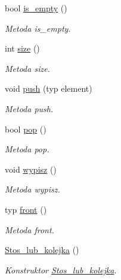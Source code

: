 \begin{DoxyCompactItemize}
\item 
bool \hyperlink{class_stos__lub__kolejka_ae3ed97741c87e68ab828989140b6cf6e}{is\+\_\+empty} ()
\begin{DoxyCompactList}\small\item\em Metoda is\+\_\+empty. \end{DoxyCompactList}\item 
int \hyperlink{class_stos__lub__kolejka_a11ef2a4fc9973ec37aa5a28a2ea824ba}{size} ()
\begin{DoxyCompactList}\small\item\em Metoda size. \end{DoxyCompactList}\item 
void \hyperlink{class_stos__lub__kolejka_ad514d78e27f4eed981eff2321e6b503e}{push} (typ element)
\begin{DoxyCompactList}\small\item\em Metoda push. \end{DoxyCompactList}\item 
bool \hyperlink{class_stos__lub__kolejka_a3d511f510942d9f0ac52a1fedee9100b}{pop} ()
\begin{DoxyCompactList}\small\item\em Metoda pop. \end{DoxyCompactList}\item 
void \hyperlink{class_stos__lub__kolejka_ae7859d2564799375487398f366342d54}{wypisz} ()
\begin{DoxyCompactList}\small\item\em Metoda wypisz. \end{DoxyCompactList}\item 
typ \hyperlink{class_stos__lub__kolejka_a9ed2032a0653ee8ae9d0111dcd3816d7}{front} ()
\begin{DoxyCompactList}\small\item\em Metoda front. \end{DoxyCompactList}\item 
\hypertarget{class_stos__lub__kolejka_aeb0f6510fab4df741b7b2316929f3704}{\hyperlink{class_stos__lub__kolejka_aeb0f6510fab4df741b7b2316929f3704}{Stos\+\_\+lub\+\_\+kolejka} ()}\label{class_stos__lub__kolejka_aeb0f6510fab4df741b7b2316929f3704}

\begin{DoxyCompactList}\small\item\em Konstruktor \hyperlink{class_stos__lub__kolejka}{Stos\+\_\+lub\+\_\+kolejka}. \end{DoxyCompactList}\end{DoxyCompactItemize}
